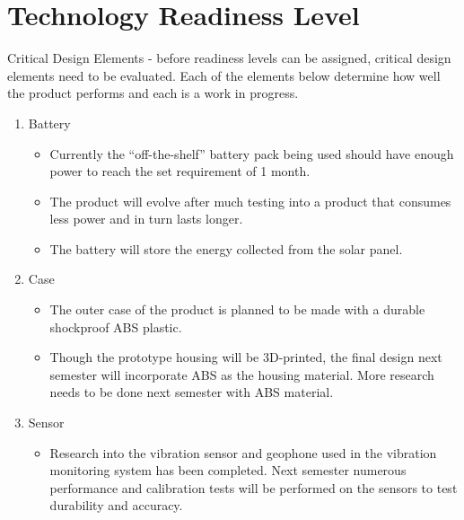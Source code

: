 \documentclass[12pt]{article}
\begin{document}
\section{Technology Readiness Level}
Critical Design Elements - before readiness levels can be assigned, critical design elements need to be evaluated. Each of the elements below determine how well the product performs and each is a work in progress.
\begin{enumerate}
	\item Battery
	\begin{itemize}
		\item Currently the ``off-the-shelf'' battery pack being used should have enough power to reach the set requirement of 1 month.
		\item The product will evolve after much testing into a product that consumes less power and in turn lasts longer.
		\item The battery will store the energy collected from the solar panel.
	\end{itemize}
	\item Case
	\begin{itemize}
		\item The outer case of the product is planned to be made with a durable shockproof ABS plastic.
		\item Though the prototype housing will be 3D-printed, the final design next semester will incorporate ABS as the housing material. More research needs to be done next semester with ABS material.
	\end{itemize}
	\item Sensor
	\begin{itemize}
		\item Research into the vibration sensor and geophone used in the vibration monitoring system has been completed. Next semester numerous performance and calibration tests will be performed on the sensors to test durability and accuracy.
	\end{itemize}
\end{enumerate}
\end{document}
